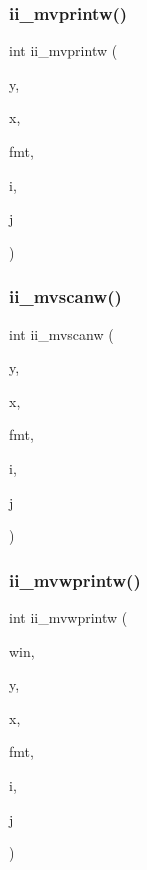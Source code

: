\mbox{\label{C-macros_8c_ada22ee1895688f4926d3109021e89e33}} 
\subsubsection{\texorpdfstring{ii\+\_\+mvprintw()}{ii\_mvprintw()}}
{\footnotesize\ttfamily int ii\+\_\+mvprintw (\begin{DoxyParamCaption}\item[{int}]{y,  }\item[{int}]{x,  }\item[{const char $\ast$}]{fmt,  }\item[{int}]{i,  }\item[{int}]{j }\end{DoxyParamCaption})}

\mbox{\label{C-macros_8c_a620ec84aba8d1a5fadbba5724f1e01b8}} 
\subsubsection{\texorpdfstring{ii\+\_\+mvscanw()}{ii\_mvscanw()}}
{\footnotesize\ttfamily int ii\+\_\+mvscanw (\begin{DoxyParamCaption}\item[{int}]{y,  }\item[{int}]{x,  }\item[{char $\ast$}]{fmt,  }\item[{int $\ast$}]{i,  }\item[{int $\ast$}]{j }\end{DoxyParamCaption})}

\mbox{\label{C-macros_8c_aba1dee7f00e339e2bcd867896705bbf0}} 
\subsubsection{\texorpdfstring{ii\+\_\+mvwprintw()}{ii\_mvwprintw()}}
{\footnotesize\ttfamily int ii\+\_\+mvwprintw (\begin{DoxyParamCaption}\item[{W\+I\+N\+D\+OW $\ast$}]{win,  }\item[{int}]{y,  }\item[{int}]{x,  }\item[{const char $\ast$}]{fmt,  }\item[{int}]{i,  }\item[{int}]{j }\end{DoxyParamCaption})}

